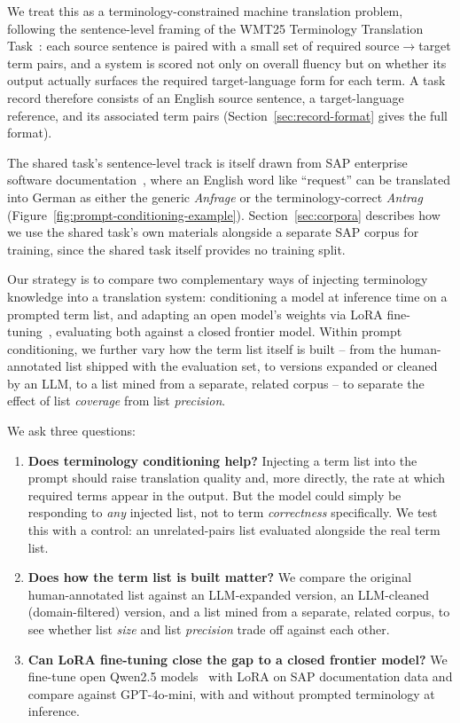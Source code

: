 \documentclass[11pt]{article}
\begin{document}
We treat this as a terminology-constrained machine translation problem, following the sentence-level framing of the WMT25 Terminology Translation Task~\citep{semenov-etal-2025-wmt25}: each source sentence is paired with a small set of required source$\rightarrow$target term pairs, and a system is scored not only on overall fluency but on whether its output actually surfaces the required target-language form for each term. A task record therefore consists of an English source sentence, a target-language reference, and its associated term pairs (Section~\ref{sec:record-format} gives the full format).

The shared task's sentence-level track is itself drawn from SAP enterprise software documentation~\citep{berger-etal-2025-learning}, where an English word like ``request'' can be translated into German as either the generic \emph{Anfrage} or the terminology-correct \emph{Antrag} (Figure~\ref{fig:prompt-conditioning-example}). Section~\ref{sec:corpora} describes how we use the shared task's own materials alongside a separate SAP corpus for training, since the shared task itself provides no training split.

Our strategy is to compare two complementary ways of injecting terminology knowledge into a translation system: conditioning a model at inference time on a prompted term list, and adapting an open model's weights via LoRA fine-tuning~\citep{hu2022lora}, evaluating both against a closed frontier model. Within prompt conditioning, we further vary how the term list itself is built -- from the human-annotated list shipped with the evaluation set, to versions expanded or cleaned by an LLM, to a list mined from a separate, related corpus -- to separate the effect of list \emph{coverage} from list \emph{precision}.

We ask three questions:

\begin{enumerate}
    \item \textbf{Does terminology conditioning help?} Injecting a term list into the prompt should raise translation quality and, more directly, the rate at which required terms appear in the output. But the model could simply be responding to \emph{any} injected list, not to term \emph{correctness} specifically. We test this with a control: an unrelated-pairs list evaluated alongside the real term list.
    \item \textbf{Does how the term list is built matter?} We compare the original human-annotated list against an LLM-expanded version, an LLM-cleaned (domain-filtered) version, and a list mined from a separate, related corpus, to see whether list \emph{size} and list \emph{precision} trade off against each other.
    \item \textbf{Can LoRA fine-tuning close the gap to a closed frontier model?} We fine-tune open Qwen2.5 models~\citep{qwenteam2024qwen25} with LoRA on SAP documentation data and compare against GPT-4o-mini, with and without prompted terminology at inference.
\end{enumerate}
\end{document}
